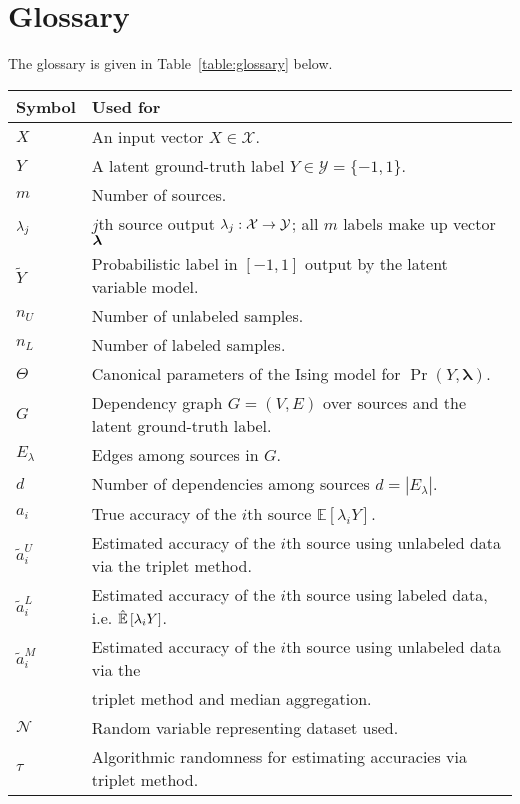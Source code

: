 \section{Glossary}
\label{sec:gloss}


The glossary is given in Table~\ref{table:glossary} below.
\begin{table*}[h]
\centering
\small
\begin{tabular}{l l}
\toprule
Symbol & Used for \\
\midrule
$X$ & An input vector $X\in\mathcal{X}$.\\
$Y$ & A latent ground-truth label $Y\in\mathcal{Y}=\{-1,1\}$.\\
$m$ & Number of sources.\\
$\lambda_j$ & $j$th source output $\lambda_j: \mathcal{X} \rightarrow \mathcal{Y}$; all $m$ labels make up vector $\bm{\lambda}$ \\
$\widetilde{Y}$ & Probabilistic label in $[-1, 1]$ output by the latent variable model.\\
$n_U$ & Number of unlabeled samples.\\
$n_L$ & Number of labeled samples.\\
$\Theta$ & Canonical parameters of the Ising model for $\Pr(Y,\bm{\lambda})$.\\
$G$ & Dependency graph $G=(V,E)$ over sources and the latent ground-truth label.\\
$E_\lambda$ & Edges among sources in $G$.\\
$d$ & Number of dependencies among sources $d=|E_\lambda|$.\\
$a_i$ & True accuracy of the $i$th source $\mathbb{E}[\lambda_iY]$.\\
$\widetilde{a}_i^U$ & Estimated accuracy of the $i$th source using unlabeled data via the triplet method.\\
$\widetilde{a}_i^L$ & Estimated accuracy of the $i$th source using labeled data, i.e. $\hat{\mathbb{E}}\left[\lambda_i Y\right]$.\\
$\widetilde{a}_i^M$ & Estimated accuracy of the $i$th source using unlabeled data via the\\
& triplet method and median aggregation.\\
$\mathcal{N}$ & Random variable representing dataset used.\\
$\tau$ & Algorithmic randomness for estimating accuracies via triplet method.\\

\end{tabular}
\end{table*}
